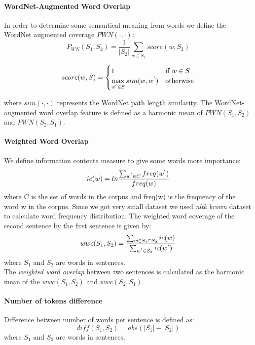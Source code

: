 \documentclass[10pt, a4paper]{article}
\begin{document}
\paragraph{WordNet-Augmented Word Overlap \\}
In order to determine some semantical meaning from words we define the WordNet augmented coverage $ PWN(\cdot, \cdot) $:
\begin{equation}\label{eq:pwn}
P_{WN}(S_1, S_2) = \frac{1}{|S_2|} \sum_{w \in S_1} score(w, S_2)
\end{equation}

\begin{equation}\label{eq:pwn-score}
score(w, S) = \begin{cases}
1 & \text{if $w \in S $}\\
\max\limits_{w^{\rq} \in S} sim(w, w^{\rq}) & \text{otherwise}
\end{cases}
\end{equation}

where $sim(\cdot, \cdot)$ represents the WordNet path length
similarity. The WordNet-augmented word overlap
feature is defined as a harmonic mean of
$PWN(S_1, S_2)$ and $PWN(S_2, S_1)$.\citep{Saric2012TakeLabSF}


\paragraph{Weighted Word Overlap \\}
We define information contente measure to give some words more importance:
\begin{equation}\label{eq:inf-content}
ic(w) = ln \frac{\sum_{w^{\rq} \in C} freq(w^{\rq}) }{freq(w)}
\end{equation}
where C is the set of words in the corpus and
freq(w) is the frequency of the word w in the corpus. Since we got very small dataset we used \emph{nltk brown} dataset to calculate word frequency distribution.
The weighted word coverage of the second sentence by the first sentence is given by:
\begin{equation}\label{eq:wwc}
wwc(S_1, S_2) = \frac{\sum_{w \in S_1 \cap S_2} ic(w)}{\sum_{w^{\rq} \in S_2} ic(w^{\rq})}
\end{equation}
where $S_1$ and $S_2$ are words in sentences.\\
The \emph{weighted word overlap} between two sentences
is calculated as the harmonic mean of the
$wwc(S_1, S_2)$ and $wwc(S_2, S_1)$.\citep{Saric2012TakeLabSF}

\paragraph{Number of tokens difference \\}
Difference between number of words per sentence is defined as:
\begin{equation}\label{eq:word-diff}
diff(S_1, S_2) = abs(|S_1| - |S_2|)
\end{equation}
where $S_1$ and $S_2$ are words in sentences.
\end{document}
